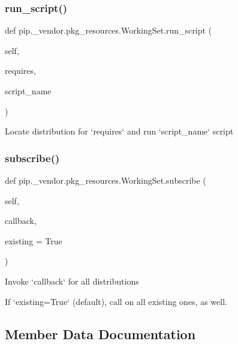 \subsubsection{\texorpdfstring{run\+\_\+script()}{run\_script()}}
{\footnotesize\ttfamily def pip.\+\_\+vendor.\+pkg\+\_\+resources.\+Working\+Set.\+run\+\_\+script (\begin{DoxyParamCaption}\item[{}]{self,  }\item[{}]{requires,  }\item[{}]{script\+\_\+name }\end{DoxyParamCaption})}

\begin{DoxyVerb}Locate distribution for `requires` and run `script_name` script\end{DoxyVerb}
 \mbox{\label{classpip_1_1__vendor_1_1pkg__resources_1_1WorkingSet_a1e0b3684618e31c481f4adcb5736c73f}} 
\subsubsection{\texorpdfstring{subscribe()}{subscribe()}}
{\footnotesize\ttfamily def pip.\+\_\+vendor.\+pkg\+\_\+resources.\+Working\+Set.\+subscribe (\begin{DoxyParamCaption}\item[{}]{self,  }\item[{}]{callback,  }\item[{}]{existing = {\ttfamily True} }\end{DoxyParamCaption})}

\begin{DoxyVerb}Invoke `callback` for all distributions

If `existing=True` (default),
call on all existing ones, as well.
\end{DoxyVerb}
 

\subsection{Member Data Documentation}
\mbox{\label{classpip_1_1__vendor_1_1pkg__resources_1_1WorkingSet_a76d4666c9b3e10cacb5dfc4b3d8b4d6d}} 
